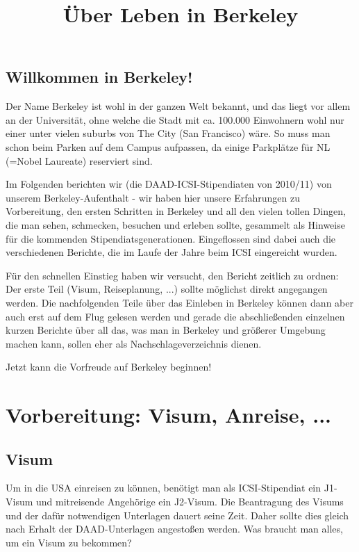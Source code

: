 \documentclass[a4paper]{scrreprt}
\begin{document}
\title{Über Leben in Berkeley}

\maketitle

\section*{Willkommen in Berkeley!}

Der Name Berkeley ist wohl in der ganzen Welt bekannt, und das liegt vor allem an der Universität, ohne welche die Stadt mit ca. 100.000 Einwohnern wohl nur einer unter vielen suburbs von The City (San Francisco) wäre. So muss man schon beim Parken auf dem Campus aufpassen, da einige Parkplätze für NL (=Nobel Laureate) reserviert sind.

Im Folgenden berichten wir (die DAAD-ICSI-Stipendiaten von 2010/11) von unserem Berkeley-Aufenthalt - wir haben hier unsere Erfahrungen zu Vorbereitung, den ersten Schritten in Berkeley und all den vielen tollen Dingen, die man sehen, schmecken, besuchen und erleben sollte, gesammelt als Hinweise für die kommenden Stipendiatsgenerationen. Eingeflossen sind dabei auch die verschiedenen Berichte, die im Laufe der Jahre beim ICSI eingereicht wurden.

Für den schnellen Einstieg haben wir versucht, den Bericht zeitlich zu ordnen: Der erste Teil (Visum, Reiseplanung, ...) sollte möglichst direkt angegangen werden. Die nachfolgenden Teile über das Einleben in Berkeley können dann aber auch erst auf dem Flug gelesen werden und gerade die abschließenden einzelnen kurzen Berichte über all das, was man in Berkeley und größerer Umgebung machen kann, sollen eher als Nachschlageverzeichnis dienen.

Jetzt kann die Vorfreude auf Berkeley beginnen!

\tableofcontents
 
\chapter{Vorbereitung: Visum, Anreise, ...}

\section{Visum}

Um in die USA einreisen zu können, benötigt man als ICSI-Stipendiat ein J1-Visum und mitreisende Angehörige ein J2-Visum. Die Beantragung des Visums und der dafür notwendigen Unterlagen dauert seine Zeit. Daher sollte dies gleich nach Erhalt der DAAD-Unterlagen angestoßen werden. Was braucht man alles, um ein Visum zu bekommen?
\end{document}
